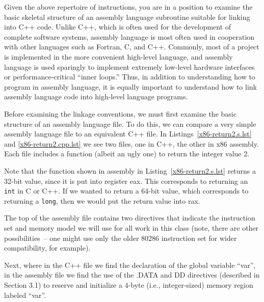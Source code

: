 Given the above repertoire of instructions, you are in a position to
examine the basic skeletal structure of an assembly language
subroutine suitable for linking into C++ code. Unlike C++, which is
often used for the development of complete software systems, assembly
language is most often used in cooperation with other languages such
as Fortran, C, and C++. Commonly, most of a project is implemented in
the more convenient high-level language, and assembly language is used
sparingly to implement extremely low-level hardware interfaces or
performance-critical ``inner loops.'' Thus, in addition to
understanding how to program in assembly language, it is equally
important to understand how to link assembly language code into
high-level language programs.

Before examining the linkage conventions, we must first examine the
basic structure of an assembly language file. To do this, we can
compare a very simple assembly language file to an equivalent C++
file. In Listings~\ref{x86-return2.s.lst} and \ref{x86-return2.cpp.lst} we see
two files, one in C++, the other in x86 assembly. Each file includes a
function (albeit an ugly one) to return the integer value 2.

Note that the function shown in assembly in
Listing~\ref{x86-return2.s.lst} returns a 32-bit value, since it is
put into register eax.  This corresponds to returning an {\tt int} in C
or C++.  If we wanted to return a 64-bit value, which corresponds to
returning a {\tt long}, then we would put the return value into rax.

The top of the assembly file contains two directives that indicate the
instruction set and memory model we will use for all work in this
class (note, there are other possibilities~-- one might use only the
older 80286 instruction set for wider compatibility, for example).

Next, where in the C++ file we find the declaration of the global
variable ``var'', in the assembly file we find the use of the .DATA
and DD directives (described in Section 3.1) to reserve and initialize
a 4-byte (i.e., integer-sized) memory region labeled ``var''.

\begin{figure}

\vspace{-0.25in}\end{figure}

